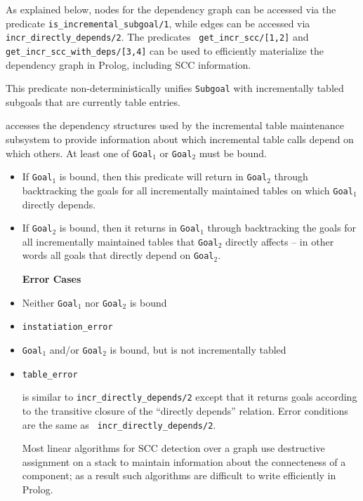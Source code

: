 As explained below, nodes for the dependency graph can be accessed via
the predicate {\tt is\_incremental\_subgoal/1}, while edges can be
accessed via {\tt incr\_directly\_depends/2}.  The predicates {\tt
  get\_incr\_scc/[1,2]} and {\tt get\_incr\_scc\_with\_deps/[3,4]} can
be used to efficiently materialize the dependency graph in Prolog,
including SCC information.

\begin{description}

%
This predicate non-deterministically unifies {\tt Subgoal} with
incrementally tabled subgoals that are currently table entries.

accesses the dependency structures used by the incremental table
maintenance subsystem to provide information about which incremental
table calls depend on which others.  At least one of {\tt Goal$_1$}
or {\tt Goal$_2$} must be bound.
\begin{itemize}
\item If {\tt Goal$_1$} is bound, then this predicate will return in
  {\tt Goal$_2$} through backtracking the goals for all incrementally
  maintained tables on which {\tt Goal$_1$} directly depends.
\item If {\tt Goal$_2$} is bound, then it returns in {\tt Goal$_1$}
  through backtracking the goals for all incrementally maintained
  tables that {\tt Goal$_2$} directly affects -- in other words all
  goals that directly depend on {\tt Goal$_2$}.  \ei

{\bf Error Cases}
\bi
\item Neither {\tt Goal$_1$} nor {\tt Goal$_2$} is bound 
\bi
\item 	{\tt instatiation\_error}
\ei
\item {\tt Goal$_1$} and/or {\tt Goal$_2$} is bound, but is not
  incrementally tabled
\bi
\item 	{\tt table\_error}
\ei
\ei

is similar to {\tt incr\_directly\_depends/2} except that it returns
goals according to the transitive closure of the ``directly depends''
relation.  Error conditions are the same as {\tt
  incr\_directly\_depends/2}.

%
Most linear algorithms for SCC detection over a graph use destructive
assignment on a stack to maintain information about the connecteness
of a component; as a result such algorithms are
difficult to write efficiently in Prolog.


\end{itemize}
\end{description}
